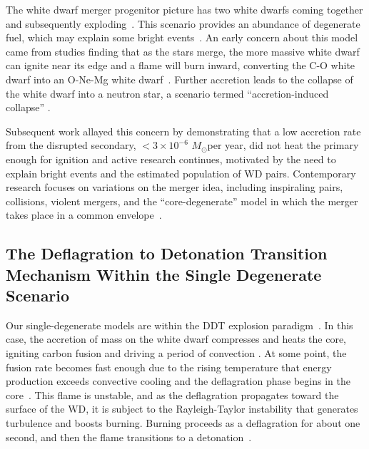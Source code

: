 \documentclass[preprint2]{aastex63}
\newcommand{\Msun}{\ensuremath{M_\odot}}
\begin{document}
The white dwarf merger progenitor picture has two white dwarfs coming
together and subsequently exploding~\citep{tutukovyungelson76,tutukovyungelson79,
webbink84,ibentutukov84}. This scenario provides an abundance of degenerate fuel,
which may explain some bright events~\citep{scalzo:2010,Yuan:2010}.
An early concern about this model came from studies finding that
as the stars merge, the more massive white dwarf can ignite near
its edge and a flame will burn inward, converting the C-O white dwarf into
an O-Ne-Mg white dwarf~\citep{saionomoto1985,saionomoto2004,Shenetal12}. Further accretion
leads to the collapse of the white dwarf
into a neutron star, a scenario termed ``accretion-induced collapse''
\citep{nomotokondo1991,brooksetalaic2017}.

Subsequent work allayed this concern by demonstrating
that a low accretion rate from the disrupted secondary, $ < 3 \times 
10^{-6}$ \Msun per year, did not heat the primary enough for ignition
\citep{kawai1987,saionomoto2004,yoonetal2007,lorenaguilaretal2009, 
pakmoretal2012b}
and active research continues, motivated by the need to explain bright events
and the estimated population of WD pairs. Contemporary
research focuses on variations on the merger idea, including inspiraling pairs,
collisions, violent mergers, and the ``core-degenerate'' model in which the merger
takes place in a common envelope~\citep{raskinetal2009,pakmoretal2011,kashi:2011,
pakmoretal2012a,Shenetal12,katzetal2016,brooksetalfast2017}.


\subsection{The Deflagration to Detonation Transition Mechanism Within
the Single Degenerate Scenario}

Our single-degenerate models are within the DDT explosion paradigm~\citep{1986SvAL,
Khokhlov1991Delayed-detonat,NiemWoos97,Niem99,belletal2004,fishjump2015}.
In this case, the accretion of mass on the white dwarf compresses and
heats the core, igniting carbon fusion and driving a period of convection
\citep{WoosWunsKuhl04,wunschwoosley2004,Kuhletal06,nonakaetal2012}.
At some point, the fusion rate becomes fast enough due to the rising
temperature that energy production exceeds convective cooling and
the deflagration phase begins in the core~\citep{Nomo84,WoosWunsKuhl04}.
This flame is unstable, and as the deflagration propagates toward the surface
of the WD, it is subject to the Rayleigh-Taylor instability that generates
turbulence and boosts burning.
Burning proceeds as a deflagration for about one second, and then
the flame transitions to a detonation~\citep{hoflich.khokhlov.ea:delayed}.
\end{document}
